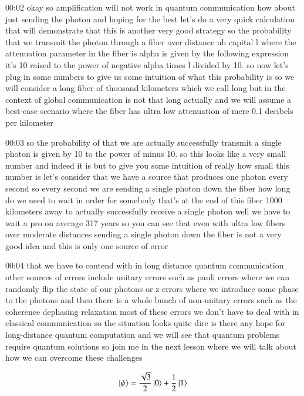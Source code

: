 00:02
okay so amplification will not work in quantum communication
how about just sending the photon and hoping for the best
let's do a very quick calculation that will demonstrate that this is another
very good strategy so the probability that we transmit the photon
through a fiber over distance uh capital
l where the attenuation parameter in the fiber is alpha
is given by the following expression it's 10 raised to the
power of negative alpha times l divided by 10.
so now let's plug in some numbers to give us some intuition of what this
probability is so we will consider a long fiber of thousand kilometers
which we call long but in the context of global communication is not that long
actually and we will assume a best-case scenario where the
fiber has ultra low attenuation of mere 0.1 decibels per kilometer

00:03
so the probability of that we are actually successfully transmit
a single photon is given by 10 to the power of minus
10. so this looks like a very small number and indeed it is
but to give you some intuition of really how small
this number is let's consider that we have a source that
produces one photon every second so every second
we are sending a single photon down the fiber
how long do we need to wait in order for somebody that's at the end of this
fiber 1000 kilometers away to actually successfully receive a single photon
well we have to wait a pro on average 317 years
so you can see that even with ultra low fibers
over moderate distances sending a single photon down the fiber
is not a very good idea and this is only one source of error

00:04
that we have to contend with in long distance quantum communication
other sources of errors include unitary errors such as pauli
errors where we can randomly flip the state of our photons
or z errors where we introduce some phase to the photons
and then there is a whole bunch of non-unitary errors such as
the coherence dephasing relaxation most of these errors we don't have to
deal with in classical communication so the situation looks quite dire
is there any hope for long-distance quantum computation
and we will see that quantum problems require quantum solutions
so join me in the next lesson where we will talk about how we can overcome
these challenges


\newpage
\begin{exercises}
\begin{equation*}
\ket{\psi} = \frac{\sqrt{3}}{2}\ket{0} + \frac{1}{2}\ket{1}
\end{equation*}


\end{exercises}

